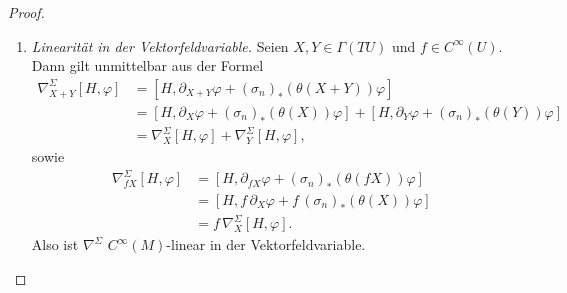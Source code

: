 \documentclass[10pt, letterpaper]{article}
\newcommand{\Ad}{\operatorname{Ad}}
\begin{document}
\begin{proof}
\begin{enumerate}
    Damit können wir jetzt die Ableitung bestimmen:
    \[
    \partial_X\varphi'
    =
    -(\sigma_n)_*\bigl((a^{-1}da)(X)\bigr)\sigma_n(a^{-1})\varphi
    +\sigma_n(a^{-1})\partial_X\varphi.
    \]
    Es folgt
    \begin{align*}
    \partial_X\varphi'+(\sigma_n)_*(\theta'(X))\varphi'
    &=
    -(\sigma_n)_*\bigl((a^{-1}da)(X)\bigr)\sigma_n(a^{-1})\varphi
    +\sigma_n(a^{-1})\partial_X\varphi \\
    &\quad
    +(\sigma_n)_*\bigl(\Ad(a^{-1})\theta(X)\bigr)\sigma_n(a^{-1})\varphi
    +(\sigma_n)_*\bigl((a^{-1}da)(X)\bigr)\sigma_n(a^{-1})\varphi \\
    &=
    \sigma_n(a^{-1})\partial_X\varphi
    +\sigma_n(a^{-1})(\sigma_n)_*(\theta(X))\varphi \\
    &=
    \sigma_n(a^{-1})
    \bigl(\partial_X\varphi+(\sigma_n)_*(\theta(X))\varphi\bigr).
    \end{align*}
    Also ist
    \begin{align*}
    \left[H',\partial_X\varphi'+(\sigma_n)_*(\theta'(X))\varphi'\right]
    &=
    \left[H\cdot a,\sigma_n(a^{-1})
    \bigl(\partial_X\varphi+(\sigma_n)_*(\theta(X))\varphi\bigr)\right] \\
    &=
    \left[H,\partial_X\varphi+(\sigma_n)_*(\theta(X))\varphi\right].
    \end{align*}
    Damit ist die Definition unabhängig von der Wahl des lokalen Spin-Rahmens und somit wohldefiniert.


    \item \emph{Linearität in der Vektorfeldvariable.}
    Seien \(X,Y\in \Gamma(TU)\) und \(f\in C^\infty(U)\). Dann gilt unmittelbar aus der Formel
    \begin{align*}
    \nabla^\Sigma_{X+Y}[H,\varphi]
    &=
    \left[H,\partial_{X+Y}\varphi+(\sigma_n)_*(\theta(X+Y))\varphi\right] \\
    &=
    \left[H,\partial_X\varphi+(\sigma_n)_*(\theta(X))\varphi\right]
    +
    \left[H,\partial_Y\varphi+(\sigma_n)_*(\theta(Y))\varphi\right] \\
    &=
    \nabla^\Sigma_X[H,\varphi]+\nabla^\Sigma_Y[H,\varphi],
    \end{align*}
    sowie
    \begin{align*}
    \nabla^\Sigma_{fX}[H,\varphi]
    &=
    \left[H,\partial_{fX}\varphi+(\sigma_n)_*(\theta(fX))\varphi\right] \\
    &=
    \left[H,f\,\partial_X\varphi+f\,(\sigma_n)_*(\theta(X))\varphi\right] \\
    &=
    f\,\nabla^\Sigma_X[H,\varphi].
    \end{align*}
    Also ist \(\nabla^\Sigma\) \(C^\infty(M)\)-linear in der Vektorfeldvariable.


\end{enumerate}
\end{proof}
\end{document}
